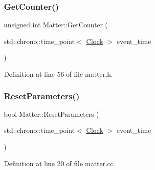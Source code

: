 \subsubsection{\texorpdfstring{Get\+Counter()}{GetCounter()}}
{\footnotesize\ttfamily unsigned int Matter\+::\+Get\+Counter (\begin{DoxyParamCaption}\item[{std\+::chrono\+::time\+\_\+point$<$ \hyperlink{universe_8h_a0ef8d951d1ca5ab3cfaf7ab4c7a6fd80}{Clock} $>$}]{event\+\_\+time }\end{DoxyParamCaption})\hspace{0.3cm}{\ttfamily [inline]}}



Definition at line 56 of file matter.\+h.

\mbox{\label{class_matter_adfd93d323e43d09fa8d8b7cdd2258611}} 
\subsubsection{\texorpdfstring{Reset\+Parameters()}{ResetParameters()}}
{\footnotesize\ttfamily bool Matter\+::\+Reset\+Parameters (\begin{DoxyParamCaption}\item[{std\+::chrono\+::time\+\_\+point$<$ \hyperlink{universe_8h_a0ef8d951d1ca5ab3cfaf7ab4c7a6fd80}{Clock} $>$}]{event\+\_\+time }\end{DoxyParamCaption})}



Definition at line 20 of file matter.\+cc.

